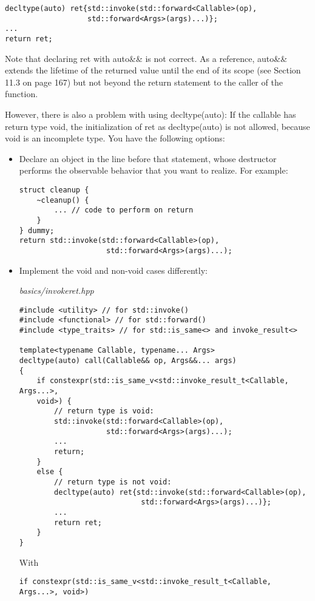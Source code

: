 \begin{lstlisting}[style=styleCXX]
decltype(auto) ret{std::invoke(std::forward<Callable>(op),
				   std::forward<Args>(args)...)};
...
return ret;
\end{lstlisting}

Note that declaring ret with auto\&\& is not correct. As a reference, auto\&\& extends the lifetime of the returned value until the end of its scope (see Section 11.3 on page 167) but not beyond the return statement to the caller of the function.

However, there is also a problem with using decltype(auto): If the callable has return type void, the initialization of ret as decltype(auto) is not allowed, because void is an incomplete type. You have the following options:

\begin{itemize}
\item 
Declare an object in the line before that statement, whose destructor performs the observable behavior that you want to realize. For example:

\begin{lstlisting}[style=styleCXX]
struct cleanup {
	~cleanup() {
		... // code to perform on return
	}
} dummy;
return std::invoke(std::forward<Callable>(op),
					std::forward<Args>(args)...);
\end{lstlisting}

\item 
Implement the void and non-void cases differently:

\noindent
\textit{basics/invokeret.hpp}
\begin{lstlisting}[style=styleCXX]
#include <utility> // for std::invoke()
#include <functional> // for std::forward()
#include <type_traits> // for std::is_same<> and invoke_result<>

template<typename Callable, typename... Args>
decltype(auto) call(Callable&& op, Args&&... args)
{
	if constexpr(std::is_same_v<std::invoke_result_t<Callable, Args...>,
	void>) {
		// return type is void:
		std::invoke(std::forward<Callable>(op),
					std::forward<Args>(args)...);
		...
		return;
	}
	else {
		// return type is not void:
		decltype(auto) ret{std::invoke(std::forward<Callable>(op),
							std::forward<Args>(args)...)};
		...
		return ret;
	}
}
\end{lstlisting}

With

\begin{lstlisting}[style=styleCXX]
if constexpr(std::is_same_v<std::invoke_result_t<Callable, Args...>, void>)
\end{lstlisting}


\end{itemize}
